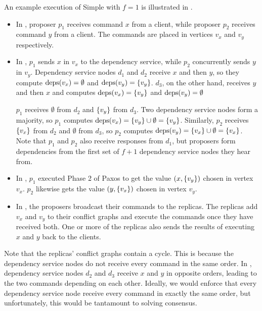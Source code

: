An example execution of Simple \BPaxos{} with $f=1$ is illustrated in
.
\begin{itemize}
  \item
    In , proposer $p_1$ receives command $x$ from
    a client, while proposer $p_2$ receives command $y$ from a client. The
    commands are placed in vertices $v_x$ and $v_y$ respectively.

  \item
    In , $p_1$ sends $x$ in $v_x$ to the dependency
    service, while $p_2$ concurrently sends $y$ in $v_y$. Dependency service
    nodes $d_1$ and $d_2$ receive $x$ and then $y$, so they compute $\text{deps}(v_x)
    = \emptyset$ and $\text{deps}(v_y) = \{v_y\}$. $d_3$, on the other hand,
    receives $y$ and then $x$ and computes $\text{deps}(v_x) = \{v_y\}$ and
    $\text{deps}(v_y) = \emptyset$

    $p_1$ receives $\emptyset$ from $d_2$ and $\{v_y\}$ from $d_3$. Two
    dependency service nodes form a majority, so $p_1$ computes $\text{deps}(v_x) =
    \{v_y\} \cup \emptyset = \{v_y\}$. Similarly, $p_2$ receives
    $\{v_x\}$ from $d_2$ and $\emptyset$ from $d_3$, so $p_2$ computes
    $\text{deps}(v_y) = \{v_x\} \cup \emptyset = \{v_x\}$. Note that $p_1$ and
    $p_2$ also receive responses from $d_1$, but proposers form dependencies
    from the first set of $f+1$ dependency service nodes they hear from.

  \item
    In , $p_1$ executed Phase 2 of Paxos to get
    the value $(x, \{v_y\})$ chosen in vertex $v_x$. $p_2$ likewise gets the
    value $(y, \{v_x\})$ chosen in vertex $v_y$.

  \item
    In , the proposers broadcast their commands to
    the replicas. The replicas add $v_x$ and $v_y$ to their conflict graphs and
    execute the commands once they have received both. One or more of the
    replicas also sends the results of executing $x$ and $y$ back to the
    clients.
\end{itemize}

Note that the replicas' conflict graphs contain a cycle. This is because the
dependency service nodes do not receive every command in the same order. In
, dependency service nodes $d_2$ and $d_3$ receive
$x$ and $y$ in opposite orders, leading to the two commands depending on each
other. Ideally, we would enforce that every dependency service node receive
every command in exactly the same order, but unfortunately, this would be
tantamount to solving consensus.

